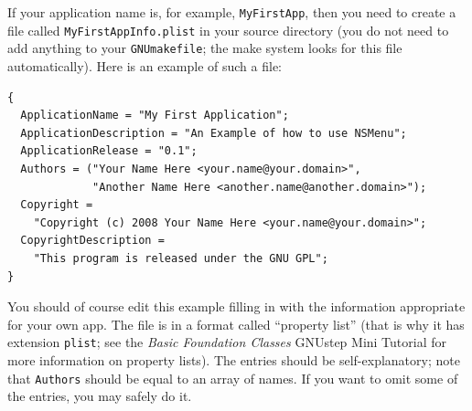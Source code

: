\documentclass[a4paper]{article}
\begin{document}
If your application name is, for example, \texttt{MyFirstApp}, then
you need to create a file called \texttt{MyFirstAppInfo.plist} in your
source directory (you do not need to add anything to your
\texttt{GNUmakefile}; the make system looks for this file
automatically).  Here is an example of such a file:
\begin{verbatim}
{
  ApplicationName = "My First Application";
  ApplicationDescription = "An Example of how to use NSMenu";
  ApplicationRelease = "0.1";
  Authors = ("Your Name Here <your.name@your.domain>", 
             "Another Name Here <another.name@another.domain>");
  Copyright = 
    "Copyright (c) 2008 Your Name Here <your.name@your.domain>";
  CopyrightDescription = 
    "This program is released under the GNU GPL";
}
\end{verbatim}
You should of course edit this example filling in with the information
appropriate for your own app.  The file is in a format called
``property list'' (that is why it has extension \texttt{plist}; see
the \emph{Basic Foundation Classes} GNUstep Mini Tutorial for more
information on property lists).  The entries should be
self-explanatory; note that \texttt{Authors} should be equal to an
array of names.  If you want to omit some of the entries, you may
safely do it.
\end{document}

